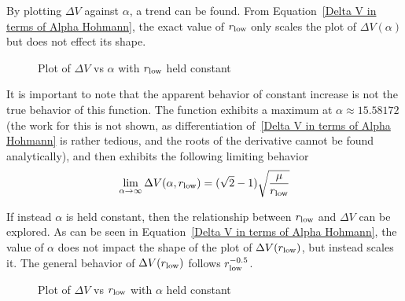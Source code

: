 \documentclass[../basicOrbitalDynamics.tex]{subfiles}
\begin{document}
By plotting $\Delta V$ against $\alpha$, a trend can be found. From Equation~\eqref{Delta V in terms of Alpha Hohmann}, the exact value of ${r}_\text{low}$ only scales the plot of $\Delta V(\alpha)$ but does not effect its shape.
\begin{figure}[H]
    \centering
    \def\rootMuOverR{5}
    \caption{Plot of $\Delta V$ vs $\alpha$ with ${r}_\text{low}$ held constant}\label{fig:Hohmann Delta V r1 const}
\end{figure}

It is important to note that the apparent behavior of constant increase is not the true behavior of this function. The function exhibits a maximum at $\alpha\approx15.58172$ (the work for this is not shown, as differentiation of~\eqref{Delta V in terms of Alpha Hohmann} is rather tedious, and the roots of the derivative cannot be found analytically), and then exhibits the following limiting behavior
\[\lim_{\alpha\rightarrow\infty}\Delta V(\alpha, {r}_\text{low})=(\sqrt{2}-1)\sqrt{\frac{\mu}{{r}_\text{low}}}\]

If instead $\alpha$ is held constant, then the relationship between ${r}_\text{low}$ and $\Delta V$ can be explored. As can be seen in Equation~\eqref{Delta V in terms of Alpha Hohmann}, the value of $\alpha$ does not impact the shape of the plot of $\Delta V({r}_\text{low})$, but instead scales it. The general behavior of $\Delta V({r}_\text{low})$ follows ${r}_\text{low}^{-0.5}$.

\begin{figure}[H]
    \centering
    \def\multBy{1.25}
    \caption{Plot of $\Delta V$ vs ${r}_\text{low}$ with $\alpha$ held constant}\label{fig:Hohmann Delta V alpha const}
\end{figure}
\end{document}
